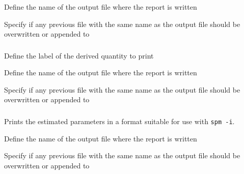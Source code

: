  {Define the name of the output file where the report is written}

 {Specify if any previous file with the same name as the output file should be overwritten or appended to}

\subsubsection[Print a derived quantity]{}

 {Define the label of the derived quantity to print}

 {Define the name of the output file where the report is written}

 {Specify if any previous file with the same name as the output file should be overwritten or appended to}

\subsubsection[Printing the estimated parameter values out as a vector]{\label{sec:InputFileFormat}}

Prints the estimated parameters in a format suitable for use with \texttt{spm -i}.

 {Define the name of the output file where the report is written}

 {Specify if any previous file with the same name as the output file should be overwritten or appended to}

\subsubsection[Print a summary of the estimated parameters]{}

